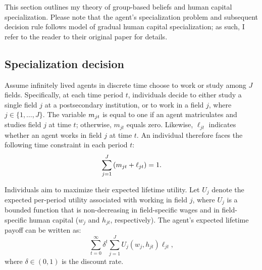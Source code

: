 This section outlines my theory of group-based beliefs and human capital specialization.
Please note that the agent's specialization problem and subsequent decision rule follows  model of gradual human capital specialization; as such, I refer to the reader to their original paper for details. 

\subsection{Specialization decision}\label{sec:specialization}

Assume infinitely lived agents in discrete time choose to work or study among $J$ fields.
Specifically, at each time period $t$, individuals decide to either study a single field $j$ at a postsecondary institution, or to work in a field $j$, where $j\in \{1, \dots, J\}$.
The variable $m_{jt}$ is equal to one if an agent matriculates and studies field $j$ at time $t$; otherwise, $m_{jt}$ equals zero. 
Likewise, $\ell_{jt}$ indicates whether an agent works in field $j$ at time $t$.
An individual therefore faces the following time constraint in each period $t$:
\begin{equation*}
    \sum_{j=1}^J \left( m_{jt} + \ell_{jt} \right) = 1.
\end{equation*}


Individuals aim to maximize their expected lifetime utility.
Let $U_j$ denote the expected per-period utility associated with working in field $j$, where $U_j$ is a bounded function that is non-decreasing in field-specific wages and in field-specific human capital ($w_j$ and $h_{jt}$, respectively). 
The agent's expected lifetime payoff can be written as: 
\begin{equation}\label{max_utility}
    \sum_{t=0}^\infty \delta^t \sum_{j=1}^J U_{j} (w_j, h_{jt}) \ell_{jt},
\end{equation}
where $\delta \in (0, 1)$ is the discount rate. 


